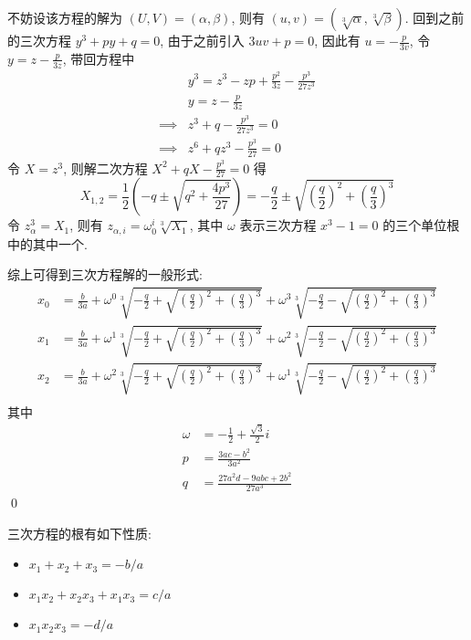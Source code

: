 \begin{solution}
不妨设该方程的解为 $(U, V) = (\alpha, \beta)$, 则有 $(u, v) = (\sqrt[3]{\alpha}, \sqrt[3]{\beta})$. 回到之前的三次方程 $y^3 + py + q = 0$, 由于之前引入 $3uv + p = 0$, 因此有 $u = -\frac{p}{3v}$, 令 $y = z - \frac{p}{3z}$, 带回方程中
\[ \begin{aligned}
    & y^3 = z^3 - zp + \frac{p^2}{3z} - \frac{p^3}{27z^3} \\
    & y = z - \frac{p}{3z} \\
    \implies & z^3 + q - \frac{p^3}{27z^3} = 0 \\
    \implies & z^6 + qz^3 - \frac{p^3}{27} = 0
\end{aligned} \]
令 $X = z^3$, 则解二次方程 $X^2 + qX - \frac{p^3}{27} = 0$ 得
\[
X_{1, 2} = \frac12 (-q \pm \sqrt{q^2 + \frac{4p^3}{27}}) = -\frac{q}{2} \pm \sqrt{(\frac{q}{2})^2 + (\frac{q}{3})^3}
\]
令 $z_\alpha^3 = X_1$, 则有 $z_{\alpha, i} = \omega^i_0 \sqrt[3]{X_1}$, 其中 $\omega$ 表示三次方程 $x^3-1 = 0$ 的三个单位根中的其中一个.

综上可得到三次方程解的一般形式:
\[ \begin{aligned}
    x_0 &= \frac{b}{3a} + \omega^{0} \sqrt[3]{-\frac{q}{2}+\sqrt{(\frac{q}{2})^2 + (\frac{q}{3})^3}} + \omega^{3} \sqrt[3]{-\frac{q}{2}-\sqrt{(\frac{q}{2})^2 + (\frac{q}{3})^3}} \\
    x_1 &= \frac{b}{3a} + \omega^{1} \sqrt[3]{-\frac{q}{2}+\sqrt{(\frac{q}{2})^2 + (\frac{q}{3})^3}} + \omega^{2} \sqrt[3]{-\frac{q}{2}-\sqrt{(\frac{q}{2})^2 + (\frac{q}{3})^3}} \\
    x_2 &= \frac{b}{3a} + \omega^{2} \sqrt[3]{-\frac{q}{2}+\sqrt{(\frac{q}{2})^2 + (\frac{q}{3})^3}} + \omega^{1} \sqrt[3]{-\frac{q}{2}-\sqrt{(\frac{q}{2})^2 + (\frac{q}{3})^3}} \\   
\end{aligned} \]
其中
\[ \begin{aligned}
\omega &= -\frac{1}{2} + \frac{\sqrt{3}}{2} i \\
p &= \frac{3ac-b^2}{3a^2} \\
q &= \frac{27a^2d - 9abc + 2b^2}{27a^3}
\end{aligned} \]
\qed
\end{solution}

\begin{lemma}[韦达定理]
三次方程的根有如下性质:
\begin{itemize}
\item $x_1 + x_2 + x_3 = -b/a$
\item $x_1 x_2 + x_2 x_3 + x_1 x_3 = c/a$
\item $x_1 x_2 x_3 = -d/a$
\end{itemize}
\end{lemma}
\endinput
